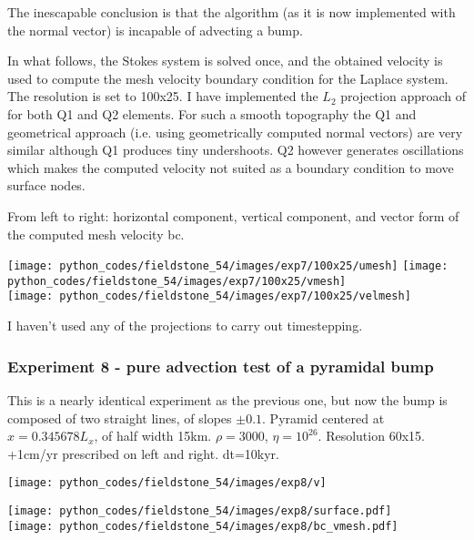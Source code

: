 The inescapable conclusion is that the algorithm (as it is now implemented with the normal 
vector) is incapable of advecting a bump. 

In what follows, the Stokes system is solved once, and the obtained velocity
is used to compute the mesh velocity boundary condition for the Laplace system. 
The resolution is set to 100x25. I have implemented the $L_2$ projection approach 
of \cite{robh17} for both Q1 and Q2 elements. For such a smooth topography the 
Q1 and geometrical approach (i.e. using geometrically computed normal vectors) are
very similar although Q1 produces tiny undershoots. Q2 however generates oscillations
which makes the computed velocity not suited as a boundary condition to move surface nodes. 

From left to right: horizontal component, vertical component, and vector form 
of the computed mesh velocity bc.

\begin{center}
\texttt{[image: python\_codes/fieldstone\_54/images/exp7/100x25/umesh]}
\texttt{[image: python\_codes/fieldstone\_54/images/exp7/100x25/vmesh]}\\
\texttt{[image: python\_codes/fieldstone\_54/images/exp7/100x25/velmesh]}
\end{center}

I haven't used any of the projections to carry out timestepping.

\subsubsection*{Experiment 8 - pure advection test of a pyramidal bump}

This is a nearly identical experiment as the previous one, but now the bump is 
composed of two straight lines, of slopes $\pm 0.1$.
Pyramid centered at $x=0.345678L_x$, of half width 15km. $\rho=3000$, $\eta=10^{26}$.
Resolution 60x15. +1cm/yr prescribed on left and right. dt=10kyr. 

\begin{center}
\texttt{[image: python\_codes/fieldstone\_54/images/exp8/v]}
\end{center}

\begin{center}
\texttt{[image: python\_codes/fieldstone\_54/images/exp8/surface.pdf]}\\
\texttt{[image: python\_codes/fieldstone\_54/images/exp8/bc\_vmesh.pdf]}
\end{center}

